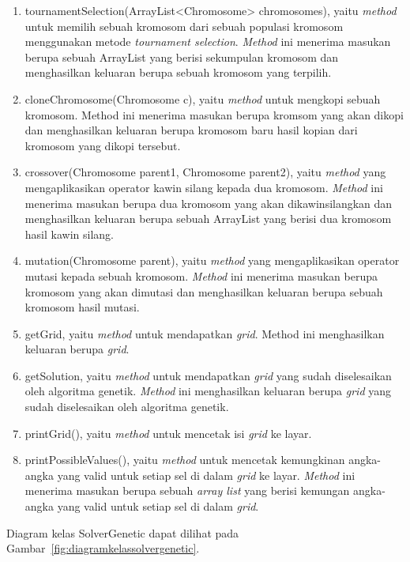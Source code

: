 \begin{enumerate}
\item tournamentSelection(ArrayList<Chromosome> chromosomes), yaitu \textit{method} untuk memilih sebuah kromosom dari sebuah populasi kromosom menggunakan metode \textit{tournament selection}. \textit{Method} ini menerima masukan berupa sebuah ArrayList yang berisi sekumpulan kromosom dan menghasilkan keluaran berupa sebuah kromosom yang terpilih.
\item cloneChromosome(Chromosome c), yaitu \textit{method} untuk mengkopi sebuah kromosom. Method ini menerima masukan berupa kromsom yang akan dikopi dan menghasilkan keluaran berupa kromosom baru hasil kopian dari kromosom yang dikopi tersebut.
\item crossover(Chromosome parent1, Chromosome parent2), yaitu \textit{method} yang mengaplikasikan operator kawin silang kepada dua kromosom. \textit{Method} ini menerima masukan berupa dua kromosom yang akan dikawinsilangkan dan menghasilkan keluaran berupa sebuah ArrayList yang berisi dua kromosom hasil kawin silang.
\item mutation(Chromosome parent), yaitu \textit{method} yang mengaplikasikan operator mutasi kepada sebuah kromosom. \textit{Method} ini menerima masukan berupa kromosom yang akan dimutasi dan menghasilkan keluaran berupa sebuah kromosom hasil mutasi.
\item getGrid, yaitu \textit{method} untuk mendapatkan \textit{grid}. Method ini menghasilkan keluaran berupa \textit{grid}.
\item getSolution, yaitu \textit{method} untuk mendapatkan \textit{grid} yang sudah diselesaikan oleh algoritma genetik. \textit{Method} ini menghasilkan keluaran berupa \textit{grid} yang sudah diselesaikan oleh algoritma genetik.
\item printGrid(), yaitu \textit{method} untuk mencetak isi \textit{grid} ke layar.
\item printPossibleValues(), yaitu \textit{method} untuk mencetak kemungkinan angka-angka yang valid untuk setiap sel di dalam \textit{grid} ke layar. \textit{Method} ini menerima masukan berupa sebuah \textit{array list} yang berisi kemungan angka-angka yang valid untuk setiap sel di dalam \textit{grid}.
\end{enumerate}

Diagram kelas SolverGenetic dapat dilihat pada Gambar~\ref{fig:diagramkelassolvergenetic}.

